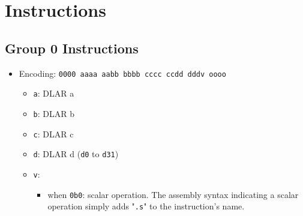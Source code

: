 \documentclass{article}
\begin{document}
\section{Instructions}
	\subsection{Group 0 Instructions}
		\begin{itemize}
		\item Encoding: \texttt{0000 aaaa aabb bbbb  cccc ccdd dddv oooo}
			\begin{itemize}
			\item \texttt{a}:  DLAR a
			\item \texttt{b}:  DLAR b
			\item \texttt{c}:  DLAR c
			\item \texttt{d}:  DLAR d (\texttt{d0} to \texttt{d31})
			\item \texttt{v}:
				\begin{itemize}
				\item when \texttt{0b0}:  scalar operation.  The assembly
				syntax indicating a scalar operation simply adds
				"\texttt{.s}" to the instruction's name.


\end{itemize}
\end{itemize}
\end{itemize}
\end{document}
